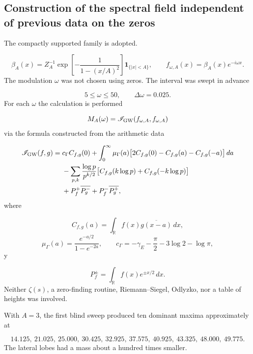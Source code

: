 \subsection{Construction of the spectral field independent of previous data on the zeros}
The compactly supported family is adopted.\par
\[
\beta_A(x)=Z_A^{-1}
\exp\!\left[-\frac{1}{1-(x/A)^2}\right]
\mathbf 1_{\{|x|<A\}},
\qquad
f_{\omega,A}(x)=\beta_A(x)e^{-i\omega x}.
\]
The modulation \(\omega\) was not chosen using zeros. The interval was swept in advance\par
\[
5\leq\omega\leq50,
\qquad
\Delta\omega=0.025.
\]
For each \(\omega\) the calculation is performed\par
\[
M_A(\omega)
=
\mathscr I_{\rm GW}
(f_{\omega,A},f_{\omega,A})
\]
via the formula constructed from the arithmetic data\par
\[
\begin{aligned}
\mathscr I_{\rm GW}(f,g)
={}&c_\Gamma C_{f,g}(0)
+\int_0^\infty
\mu_\Gamma(a)
\bigl[
2C_{f,g}(0)-C_{f,g}(a)-C_{f,g}(-a)
\bigr]\,da\\
&-\sum_{p,k}
\frac{\log p}{p^{k/2}}
\bigl[
C_{f,g}(k\log p)+C_{f,g}(-k\log p)
\bigr]\\
&+P_f^+\overline{P_g^-}
+P_f^-\overline{P_g^+},
\end{aligned}
\]
where\par
\[
C_{f,g}(a)=\int_{\mathbb R}f(x)\overline{g(x-a)}\,dx,
\]
\[
\mu_\Gamma(a)=\frac{e^{-a/2}}{1-e^{-2a}},
\qquad
c_\Gamma=-\gamma_{\!E}-\frac{\pi}{2}-3\log2-\log\pi,
\]
y\par
\[
P_f^\pm=\int_{\mathbb R}f(x)e^{\pm x/2}\,dx.
\]
Neither \(\zeta(s)\), a zero-finding routine, Riemann–Siegel, Odlyzko, nor a table of heights was involved.\par
With \(A=3\), the first blind sweep produced ten dominant maxima approximately at\par
\[
14.125,\ 21.025,\ 25.000,\ 30.425,\ 32.925,\ 37.575,\ 40.925,\ 43.325,\ 48.000,\ 49.775.
\]
The lateral lobes had a mass about a hundred times smaller.\par
{}
